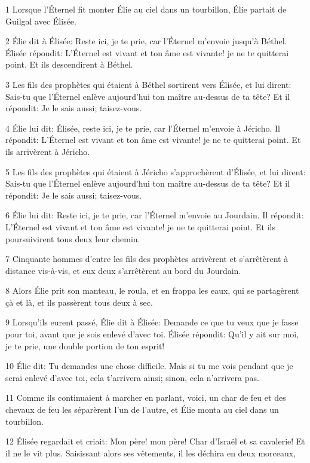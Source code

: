 \par 1 Lorsque l'Éternel fit monter Élie au ciel dans un tourbillon, Élie partait de Guilgal avec Élisée.
\par 2 Élie dit à Élisée: Reste ici, je te prie, car l'Éternel m'envoie jusqu'à Béthel. Élisée répondit: L'Éternel est vivant et ton âme est vivante! je ne te quitterai point. Et ils descendirent à Béthel.
\par 3 Les fils des prophètes qui étaient à Béthel sortirent vers Élisée, et lui dirent: Sais-tu que l'Éternel enlève aujourd'hui ton maître au-dessus de ta tête? Et il répondit: Je le sais aussi; taisez-vous.
\par 4 Élie lui dit: Élisée, reste ici, je te prie, car l'Éternel m'envoie à Jéricho. Il répondit: L'Éternel est vivant et ton âme est vivante! je ne te quitterai point. Et ils arrivèrent à Jéricho.
\par 5 Les fils des prophètes qui étaient à Jéricho s'approchèrent d'Élisée, et lui dirent: Sais-tu que l'Éternel enlève aujourd'hui ton maître au-dessus de ta tête? Et il répondit: Je le sais aussi; taisez-vous.
\par 6 Élie lui dit: Reste ici, je te prie, car l'Éternel m'envoie au Jourdain. Il répondit: L'Éternel est vivant et ton âme est vivante! je ne te quitterai point. Et ils poursuivirent tous deux leur chemin.
\par 7 Cinquante hommes d'entre les fils des prophètes arrivèrent et s'arrêtèrent à distance vis-à-vis, et eux deux s'arrêtèrent au bord du Jourdain.
\par 8 Alors Élie prit son manteau, le roula, et en frappa les eaux, qui se partagèrent çà et là, et ils passèrent tous deux à sec.
\par 9 Lorsqu'ils eurent passé, Élie dit à Élisée: Demande ce que tu veux que je fasse pour toi, avant que je sois enlevé d'avec toi. Élisée répondit: Qu'il y ait sur moi, je te prie, une double portion de ton esprit!
\par 10 Élie dit: Tu demandes une chose difficile. Mais si tu me vois pendant que je serai enlevé d'avec toi, cela t'arrivera ainsi; sinon, cela n'arrivera pas.
\par 11 Comme ils continuaient à marcher en parlant, voici, un char de feu et des chevaux de feu les séparèrent l'un de l'autre, et Élie monta au ciel dans un tourbillon.
\par 12 Élisée regardait et criait: Mon père! mon père! Char d'Israël et sa cavalerie! Et il ne le vit plus. Saisissant alors ses vêtements, il les déchira en deux morceaux,
